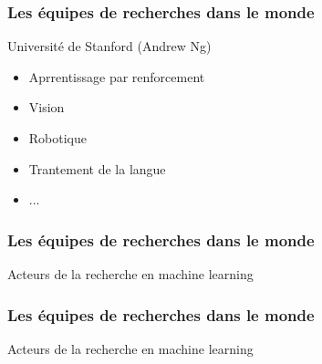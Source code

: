 \documentclass{formation}
\begin{document}
\begin{frame}
  \frametitle{Les équipes de recherches dans le monde}
  Université de Stanford (Andrew Ng)
  \begin{itemize}
  \item Aprrentissage par renforcement
  \item Vision
  \item Robotique
  \item Trantement de la langue
  \item ...
  \end{itemize}
\end{frame}

\begin{frame}
  \frametitle{Les équipes de recherches dans le monde}
  Acteurs de la recherche en machine learning
\end{frame}

\begin{frame}
  \frametitle{Les équipes de recherches dans le monde}
  Acteurs de la recherche en machine learning
\end{frame}
\end{document}
